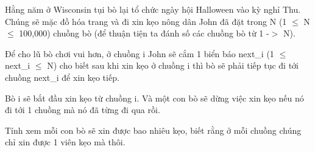 Hằng năm ở Wisconsin tụi bò lại tổ chức ngày hội Halloween vào kỳ nghỉ Thu. Chúng sẽ mặc đồ hóa trang và đi xin kẹo nông dân John đã đặt trong  N (1  $\le$  N  $\le$  100,000) chuồng bò (để thuận tiện ta đánh số các chuồng  bò từ 1 -$>$ N).  

   Để cho lũ bò chơi vui hơn, ở chuồng i John sẽ cắm 1 biển báo next\_i  (1  $\le$  next\_i  $\le$  N) cho biết sau khi xin kẹo ở chuồng i thì bò sẽ phải  tiếp tục đi tới chuồng next\_i để xin kẹo tiếp.  

   Bò i sẽ bắt đầu xin kẹo từ chuồng i. Và một con bò sẽ dừng việc xin kẹo nếu nó đi tới 1 chuồng mà nó đã từng đi qua rồi.  

   Tính xem mỗi con bò sẽ xin được bao nhiêu kẹo, biết rằng ở mỗi chuồng chúng chỉ xin được 1 viên kẹo mà thôi.
